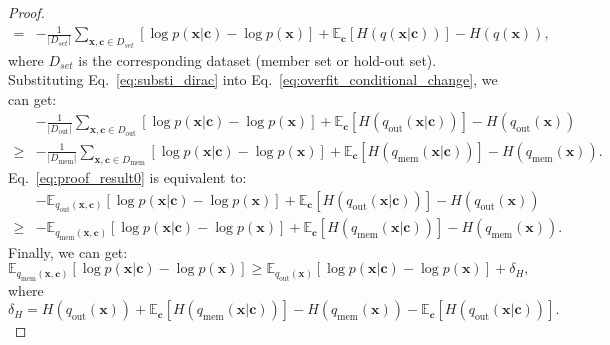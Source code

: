 \documentclass{article}
\newcommand{\vect}[1]{\mathbf{#1}}
\theoremstyle{plain}
\theoremstyle{remark}
\begin{document}
\begin{proof}
\begin{equation}
\begin{aligned}
        = &-\frac{1}{|D_{set}|} \sum_{\vect{x},\vect{c} \in D_{set}} [\log p(\vect{x}|\vect{c}) - \log p(\vect{x})] + \mathbb{E}_{\vect{c}}[H(q(\vect{x}|\vect{c}))]-H(q(\vect{x})),
    \end{aligned}
\end{equation}
where $D_{set}$ is the corresponding dataset (member set or hold-out set). Substituting Eq.~\eqref{eq:substi_dirac} into Eq.~\eqref{eq:overfit_conditional_change}, we can get:
\begin{equation}\label{eq:proof_result0}
    \begin{aligned}
      & -\frac{1}{|D_{\text{out}}|} \sum_{\vect{x},\vect{c} \in D_{\text{out}}} [\log p(\vect{x}|\vect{c}) - \log p(\vect{x})]
       + \mathbb{E}_{\vect{c}}[H(q_{\text{out}}(\vect{x}|\vect{c}))]-H(q_{\text{out}}(\vect{x}))
    \\ \geq  
       & -\frac{1}{|D_{\text{mem}}|} \sum_{\vect{x},\vect{c} \in D_{\text{mem}}} [\log p(\vect{x}|\vect{c}) - \log p(\vect{x})]
       + \mathbb{E}_{\vect{c}}[H(q_{\text{mem}}(\vect{x}|\vect{c}))]-H(q_{\text{mem}}(\vect{x})).
    \end{aligned}
\end{equation}
Eq.~\eqref{eq:proof_result0} is equivalent to:
\begin{equation}\label{eq:proof_result1}
    \begin{aligned}
      & -  \mathbb{E}_{q_{\text{out}}(\mathbf{x}, \vect{c})} [\log p(\vect{x}|\vect{c}) - \log p(\vect{x})]
       + \mathbb{E}_{\vect{c}}[H(q_{\text{out}}(\vect{x}|\vect{c}))]-H(q_{\text{out}}(\vect{x}))
    \\ \geq  
       & -  \mathbb{E}_{q_{\text{mem}}(\mathbf{x}, \vect{c})} [\log p(\vect{x}|\vect{c}) - \log p(\vect{x})]
       + \mathbb{E}_{\vect{c}}[H(q_{\text{mem}}(\vect{x}|\vect{c}))]-H(q_{\text{mem}}(\vect{x})).
    \end{aligned}
\end{equation}
Finally, we can get:
\begin{equation}
       \mathbb{E}_{q_{\text{mem}}(\vect{x}, \vect{c})}[\log p(\vect{x}|\vect{c}) - \log p(\vect{x})]
          \geq        
       \mathbb{E}_{q_{\text{out}}(\vect{x})}[\log p(\vect{x}|\vect{c}) - \log p(\vect{x})]
       + \delta_{H},
\end{equation}
where
\begin{equation}
    \delta_H = H(q_{\text{out}}(\vect{x})) + \mathbb{E}_{\vect{c}}[H(q_{\text{mem}}(\vect{x}|\vect{c}))]
       - H(q_{\text{mem}}(\vect{x})) - \mathbb{E}_{\vect{c}}[H(q_{\text{out}}(\vect{x}|\vect{c}))].
\end{equation}
\end{proof}
\end{document}
